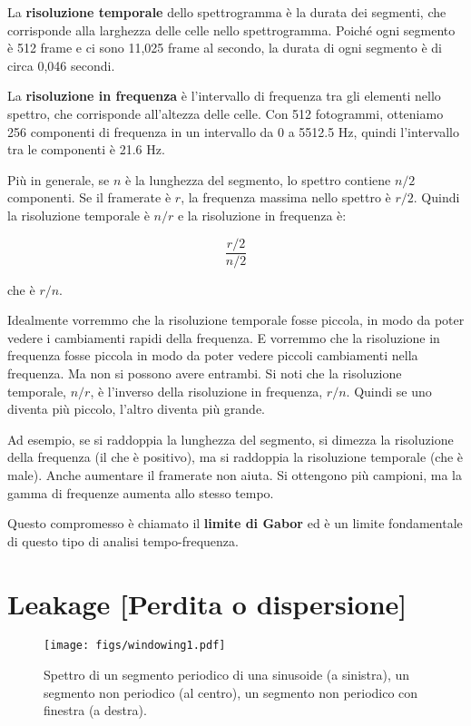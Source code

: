\documentclass[12pt,a4paper]{book}
\begin{document}
La {\bf risoluzione temporale} dello spettrogramma è la durata dei segmenti, che corrisponde alla larghezza delle celle nello spettrogramma. Poiché ogni segmento è 512 frame e ci sono 11,025 frame al secondo, la durata di ogni segmento è di circa 0,046 secondi.

La {\bf risoluzione in frequenza} è l'intervallo di frequenza tra gli elementi nello spettro, che corrisponde all'altezza delle celle. Con 512 fotogrammi, otteniamo 256 componenti di frequenza in un intervallo da 0 a 5512.5 Hz, quindi l'intervallo tra le componenti è 21.6 Hz.

Più in generale, se $n$ è la lunghezza del segmento, lo spettro contiene $n/2$ componenti. Se il framerate è $r$, la frequenza massima nello spettro è $r/2$. Quindi la risoluzione temporale è $n/r$ e la risoluzione in frequenza è:

%
\[ \frac{r/2}{n/2} \] 

%
che è $r/n$.

Idealmente vorremmo che la risoluzione temporale fosse piccola, in modo da poter vedere i cambiamenti rapidi della frequenza. E vorremmo che la risoluzione in frequenza fosse piccola in modo da poter vedere piccoli cambiamenti nella frequenza. Ma non si possono avere entrambi. Si noti che la risoluzione temporale, $n/r$, è l'inverso della risoluzione in frequenza, $r/n$. Quindi se uno diventa più piccolo, l'altro diventa più grande.

Ad esempio, se si raddoppia la lunghezza del segmento, si dimezza la risoluzione della frequenza (il che è positivo), ma si raddoppia la risoluzione temporale (che è male). Anche aumentare il framerate non aiuta. Si ottengono più campioni, ma la gamma di frequenze aumenta allo stesso tempo.

Questo compromesso è chiamato il {\bf limite di Gabor} ed è un limite fondamentale di questo tipo di analisi tempo-frequenza.

\section{Leakage [Perdita o dispersione]} 

\begin{figure} 

\centerline{\texttt{[image: figs/windowing1.pdf]}} \caption{Spettro di un segmento periodico di una sinusoide (a sinistra), un segmento non periodico (al centro), un segmento non periodico con finestra (a destra).} \label{fig.windowing1} \end{figure} 
\end{document}
